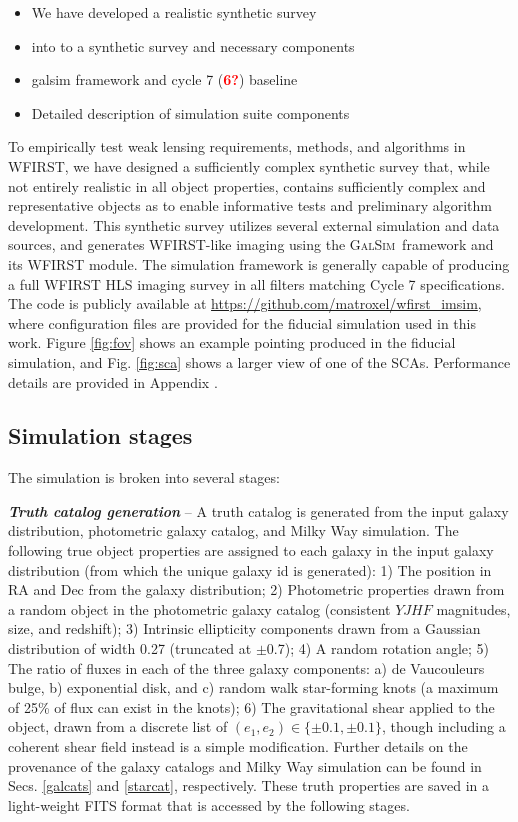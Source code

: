 \documentclass[aps,prd, amsmath,amssymb,superscriptaddress,showkeys,nofootinbib,reprint,preprintnumbers]{revtex4-1}
\newcommand{\verify}[1]{\textcolor{red}{\textbf{{#1}}}}
\newcommand{\galsim}{\textsc{GalSim}}
\begin{document}
\begin{itemize}
\item We have developed a realistic synthetic survey 
\item into to a synthetic survey and necessary components
\item galsim framework and cycle 7 (\verify{6?}) baseline
\item Detailed description of simulation suite components
\end{itemize}

To empirically test weak lensing requirements, methods, and algorithms in WFIRST, we have designed a sufficiently complex synthetic survey that, while not entirely realistic in all object properties, contains sufficiently complex and representative objects as to enable informative tests and preliminary algorithm development. 
This synthetic survey utilizes several external simulation and data sources, and generates WFIRST-like imaging using the \galsim\ framework and its WFIRST module. 
The simulation framework is generally capable of producing a full WFIRST HLS imaging survey in all filters matching Cycle 7 specifications. 
The code is publicly available at \url{https://github.com/matroxel/wfirst_imsim}, where configuration files are provided for the fiducial simulation used in this work.
Figure \ref{fig:fov} shows an example pointing produced in the fiducial simulation, and Fig. \ref{fig:sca} shows a larger view of one of the SCAs. 
Performance details are provided in Appendix \cite{app:performance}. 

\subsection{Simulation stages}\label{stages}

The simulation is broken into several stages:

\textbf{\textit{Truth catalog generation}} -- A truth catalog is generated from the input galaxy distribution, photometric galaxy catalog, and Milky Way simulation. 
The following true object properties are assigned to each galaxy in the input galaxy distribution (from which the unique galaxy id is generated): 
1) The position in RA and Dec from the galaxy distribution; 
2) Photometric properties drawn from a random object in the photometric galaxy catalog (consistent $YJHF$ magnitudes, size, and redshift); 
3) Intrinsic ellipticity components drawn from a Gaussian distribution of width 0.27 (truncated at $\pm$0.7); 
4) A random rotation angle; 
5) The ratio of fluxes in each of the three galaxy components: a) de Vaucouleurs bulge, b) exponential disk, and c) random walk star-forming knots (a maximum of 25\% of flux can exist in the knots); 
6) The gravitational shear applied to the object, drawn from a discrete list of $(e_1, e_2) \in \{\pm 0.1, \pm 0.1\}$, though including a coherent shear field instead is a simple modification. 
Further details on the provenance of the galaxy catalogs and Milky Way simulation can be found in Secs. \ref{galcats} and \ref{starcat}, respectively. 
These truth properties are saved in a light-weight FITS format that is accessed by the following stages.
\end{document}
